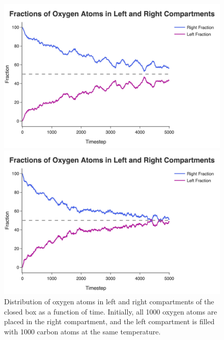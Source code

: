 \documentclass[10pt]{article}
\begin{document}
\begin{figure}[H]
\begin{minipage}{0.43\linewidth}
        \includegraphics[width=\linewidth]{../figures/jpg/distribution/atoms_1000_temp_5000_compartment_fractions.jpg}
    \end{minipage}
    \begin{minipage}{0.43\linewidth}
        \includegraphics[width=\linewidth]{../figures/jpg/distribution/atoms_1000_temp_10000_compartment_fractions.jpg}
    \end{minipage}
    \caption{Distribution of oxygen atoms in left and right compartments of the closed box as a function of time. Initially, all 1000 oxygen atoms are placed in the right compartment, and the left compartment is filled with 1000 carbon atoms at the same temperature.}
    \label{fig:compartment_fractions}
\end{figure}
\end{document}
